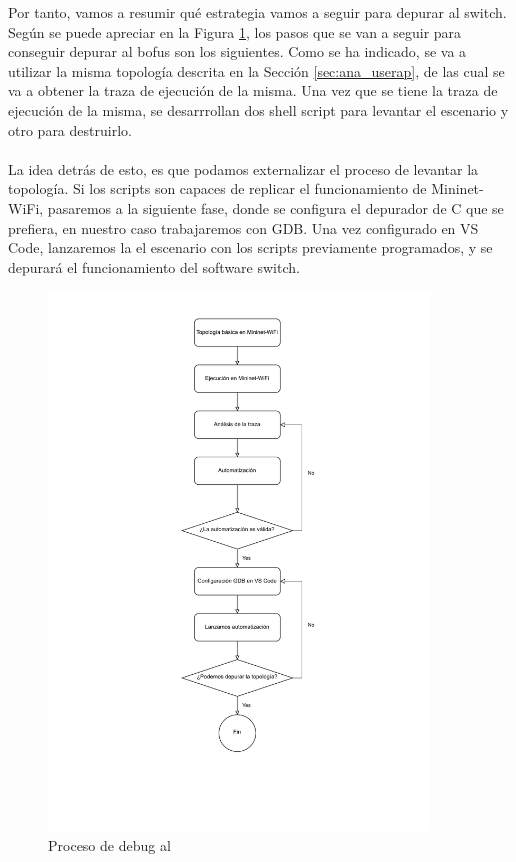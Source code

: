 Por tanto, vamos a resumir qué estrategia vamos a seguir para depurar al switch. Según se puede apreciar en la Figura \ref{fig:debugBOFUSS}, los pasos que se van a seguir para conseguir depurar al \gls{bofus} son los siguientes. Como se ha indicado, se va a utilizar la misma topología descrita en la Sección \ref{sec:ana_userap}, de las cual se va a obtener la traza de ejecución de la misma. Una vez que se tiene la traza de ejecución de la misma, se desarrrollan dos shell script para levantar el escenario y otro para destruirlo. \\
\\
La idea detrás de esto, es que podamos externalizar el proceso de levantar la topología. Si los scripts son capaces de replicar el funcionamiento de Mininet-WiFi, pasaremos a la siguiente fase, donde se configura el depurador de C que se prefiera, en nuestro caso trabajaremos con GDB. Una vez configurado en VS Code, lanzaremos la el escenario con los scripts previamente programados, y se depurará el funcionamiento del software switch.\\

\newpage

\begin{figure}[ht!]
    \centering
    \includegraphics[width=0.9\textwidth]{archivos/img/analisis/debugBOFUSS.drawio.pdf}
    \caption{Proceso de debug al }
    \label{fig:debugBOFUSS}
\end{figure}


